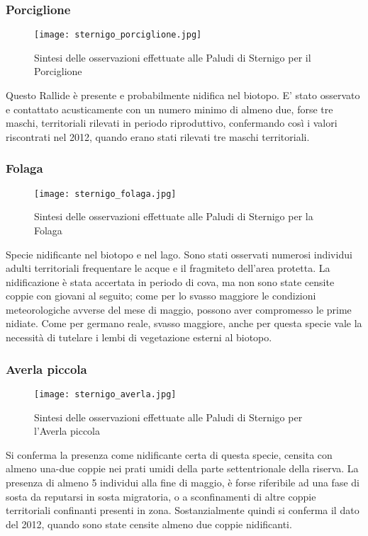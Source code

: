 \documentclass[11pt,a4paper,twoside]{memoir}
\begin{document}
\subsubsection{Porciglione}
\vspace*{\fill}
\begin{figure}[H]
  \centering
  \texttt{[image: sternigo\_porciglione.jpg]}
  \caption{Sintesi delle osservazioni effettuate alle Paludi di Sternigo per il Porciglione}
\end{figure}\vspace*{\fill}
Questo Rallide è presente e probabilmente nidifica nel biotopo. E’ stato osservato e contattato acusticamente con un numero minimo di almeno due, forse tre maschi, territoriali rilevati in periodo riproduttivo, confermando così i valori riscontrati nel 2012, quando erano stati rilevati tre  maschi territoriali.

\subsubsection{Folaga}
\vspace*{\fill}
\begin{figure}[H]
  \centering
  \texttt{[image: sternigo\_folaga.jpg]}
  \caption{Sintesi delle osservazioni effettuate alle Paludi di Sternigo per la Folaga}
\end{figure}\vspace*{\fill}
Specie nidificante nel biotopo e nel lago. Sono stati osservati numerosi individui adulti territoriali frequentare le acque e il fragmiteto dell’area protetta. La nidificazione è stata accertata in periodo di cova, ma non sono state censite coppie con giovani al seguito; come per lo svasso maggiore le condizioni meteorologiche avverse del mese di maggio, possono aver compromesso le prime nidiate. Come per germano reale, svasso maggiore, anche per questa specie vale la necessità di tutelare i lembi di vegetazione esterni al biotopo. 

\subsubsection{Averla piccola}
\vspace*{\fill}
\begin{figure}[H]
  \centering
  \texttt{[image: sternigo\_averla.jpg]}
  \caption{Sintesi delle osservazioni effettuate alle Paludi di Sternigo per l'Averla piccola}
\end{figure}\vspace*{\fill}
Si conferma la presenza come nidificante certa di questa specie, censita con almeno una-due coppie nei prati umidi della parte settentrionale della riserva. La presenza di almeno 5 individui alla fine di maggio, è forse riferibile ad una fase di sosta da reputarsi in sosta migratoria, o a sconfinamenti di altre coppie territoriali confinanti presenti in zona. Sostanzialmente quindi si conferma il dato del 2012, quando sono state censite almeno due coppie nidificanti.
\end{document}
